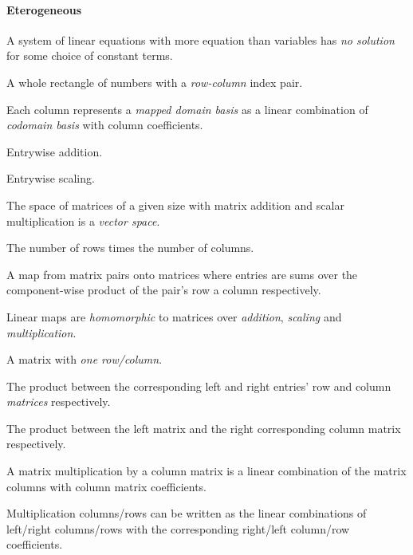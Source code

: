 \begin{multicols}{3}
  \paragraph{\textbf{Eterogeneous}}
  A system of linear equations with more equation than variables has \textit{no solution} for some choice of constant terms.
  
  A whole rectangle of numbers with a \textit{row-column} index pair.
  
  Each column represents a \textit{mapped domain basis} as a linear combination of \textit{codomain basis} with column coefficients.

  Entrywise addition.

  Entrywise scaling.
  
  The space of matrices of a given size with matrix addition and scalar multiplication is a \textit{vector space}.
  
  The number of rows times the number of columns.

  A map from matrix pairs onto matrices where entries are sums over the component-wise product of
  the pair's row a column respectively.
  
  Linear maps are \textit{homomorphic} to matrices over \textit{addition}, \textit{scaling} and \textit{multiplication}.

  A matrix with \textit{one row/column}.

  The product between the corresponding left and right entries' row and column \textit{matrices} respectively.

  The product between the left matrix and the right corresponding column matrix respectively.

  A matrix multiplication by a column matrix is a linear combination of the
  matrix columns with column matrix coefficients.

  Multiplication columns/rows can be written as the linear combinations of
  left/right columns/rows with
  the corresponding right/left column/row coefficients.
  

\end{multicols}

